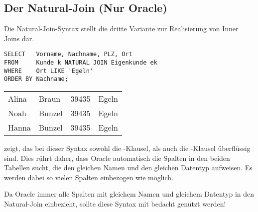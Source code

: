         \subsection{Der Natural-Join (Nur Oracle)}
          Die Natural-Join-Syntax stellt die dritte Variante zur Realisierung von Inner Joins dar.
          \begin{lstlisting}[language=oracle_sql,caption={Die Natural-Join-Syntax},label=sql04_08]
SELECT   Vorname, Nachname, PLZ, Ort
FROM     Kunde k NATURAL JOIN Eigenkunde ek
WHERE    Ort LIKE 'Egeln'
ORDER BY Nachname;
          \end{lstlisting}
          \begin{center}
            \begin{small}
              \tablehead{}
              \begin{oraclesql}
                \begin{supertabular}{llll}
                  Alina & Braun & 39435 & Egeln \\
                  Noah & Bunzel & 39435 & Egeln \\
                  Hanna & Bunzel & 39435 & Egeln \\
                \end{supertabular}
              \end{oraclesql}
            \end{small}
          \end{center}
           zeigt, das bei dieser Syntax sowohl die -Klausel, als auch die -Klausel \"uberfl\"ussig sind. Dies r\"uhrt daher, dass Oracle automatisch die Spalten in den beiden Tabellen sucht, die den gleichen Namen und den gleichen Datentyp aufweisen. Es werden dabei so vielen Spalten einbezogen wie m\"oglich.
          \begin{merke}
            Da Oracle immer alle Spalten mit gleichem Namen und gleichem Datentyp in den Natural-Join einbezieht, sollte diese Syntax mit bedacht genutzt werden!
          \end{merke}
